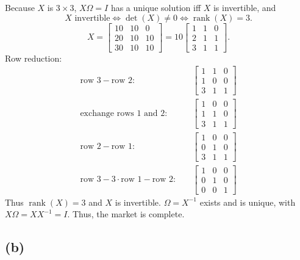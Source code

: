 \documentclass[11pt]{article}
\begin{document}
Because $X$ is $3 \times 3$, $X\Omega = I$ has a unique solution iff $X$ is invertible, and
\[
X \text{ invertible} \iff \det(X) \neq 0 \iff \operatorname{rank}(X) = 3.
\]
\[
X = \begin{bmatrix} 10 & 10 & 0 \\ 20 & 10 & 10 \\ 30 & 10 & 10 \end{bmatrix}
= 10 \begin{bmatrix} 1 & 1 & 0 \\ 2 & 1 & 1 \\ 3 & 1 & 1 \end{bmatrix}.
\]
Row reduction:
\begin{align*}
\text{row 3} - \text{row 2}: &\quad \begin{bmatrix} 1 & 1 & 0 \\ 1 & 0 & 0 \\ 3 & 1 & 1 \end{bmatrix} \\
\text{exchange rows 1 and 2}: &\quad \begin{bmatrix} 1 & 0 & 0 \\ 1 & 1 & 0 \\ 3 & 1 & 1 \end{bmatrix} \\
\text{row 2} - \text{row 1}: &\quad \begin{bmatrix} 1 & 0 & 0 \\ 0 & 1 & 0 \\ 3 & 1 & 1 \end{bmatrix} \\
\text{row 3} - 3\cdot\text{row 1} - \text{row 2}: &\quad \begin{bmatrix} 1 & 0 & 0 \\ 0 & 1 & 0 \\ 0 & 0 & 1 \end{bmatrix}
\end{align*}
Thus $\operatorname{rank}(X) = 3$ and $X$ is invertible. $\Omega = X^{-1}$ exists and is unique, with $X\Omega = XX^{-1} = I$. Thus, the market is complete.

\subsection*{(b)}
\end{document}
